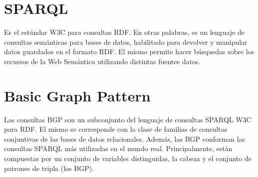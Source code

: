 \documentclass[10pt,a4paper]{article}
\begin{document}
\section{SPARQL}
Es el estándar W3C para consultas RDF. En otras palabras, es un lenguaje de consultas semánticas para bases de datos, habilitado para devolver y manipular datos guardados en el formato RDF. El mismo permite hacer búsquedas sobre los recursos de la Web Semántica utilizando distintas fuentes datos.

\section{Basic Graph Pattern}
Las consultas BGP son un subconjunto del lenguaje de consultas SPARQL W3C para RDF. El mismo se corresponde con la clase de familias de consultas conjuntivas de las bases de datos relacionales. Además, las BGP conforman las consultas SPARQL más utilizadas en el mundo real.
Principalmente, están compuestas por un conjunto de variables distinguidas, la cabeza y el conjunto de patrones de tripla (los BGP).
\end{document}
